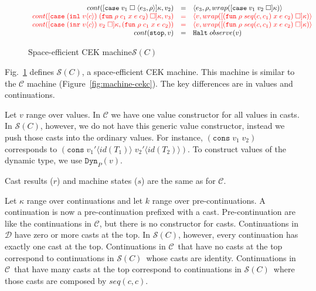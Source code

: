 \documentclass[acmsmall,review,anonymous]{acmart}\settopmatter{printfolios=true,printccs=false,printacmref=false}
\newcommand{\figref}[1]{Fig.~\ref{#1}}
\newcommand{\funrule}[3]{#1 &=& #2 & #3\\}
\newcommand{\hifunrule}[3]{\highlight{#1} &\highlight{=}& \highlight{#2} & 
\highlight{#3}\\}
\newcommand{\sOOinspect}[3]{\langle#1,#2,#3\rangle}
\newcommand{\sOOreturn}[2]{\langle#1,#2\rangle}
\newcommand{\sOOhalt}[1]{\mathtt{Halt} \; #1}
\newcommand{\vOOcons}[2]{\mathtt{cons}\;#1\;#2}
\newcommand{\kOOmt}[0]{\mathtt{stop}}
\newcommand{\kOOappII}[2]{
  [#1 \; \square]#2}
\newcommand{\kOOcaseII}[4]{
  [\mathtt{case} \; #1 \; \square \; \langle#2,#3\rangle ]#4}
\newcommand{\kOOcaseIII}[3]{
  [\mathtt{case} \; #1 \; #2 \; \square]#3}
\newcommand{\hcvOOinj}[2]{\mathtt{Dyn}_{#1}(#2)}
\newcommand{\hcvOOfun}[5]{\mathtt{fun} \; #2 \; #1 \; #3 \; #4 \; #5}
\newcommand{\hcvOOcons}[4]{\mathtt{cons}\;#1\langle#2\rangle\;#3\langle#4\rangle}
\newcommand{\hcvOOinl}[2]{\mathtt{inl}\;#1\langle#2\rangle}
\newcommand{\hcvOOinr}[2]{\mathtt{inr}\;#1\langle#2\rangle}
\newcommand{\hckOOmt}[0]{\mathtt{stop}}
\newcommand{\judgeSreduceTrans}[3]{#2 \longmapsto_{\mathcal{S}(#1)}^{*} #3}
\newcommand{\judgeSeval}[3]{eval_{\mathcal{S}(#1)}(#2) = #3}
\newcommand{\ineffCEK}{$\mathcal{C}$}
\newcommand{\ineffCEKD}{$\mathcal{D}$}
\newcommand{\effCEK}[1]{$\mathcal{S}(#1)$}
\newcommand{\continue}[2]{cont(#2,#1)}
\newcommand{\highlight}[1]{{\color{red} #1}}
\begin{document}
\begin{figure}
\[\begin{array}{rclr}
\funrule{
  \continue{v_2}{
    \kOOcaseII{v_1}{e_3}{\rho}{\kappa}
  }
}{
  \sOOinspect{e_3}{\rho}{
  wrap(\kOOcaseIII{v_1}{v_2}{\kappa})
  }
}{}

\hifunrule{
  \continue{v_3}{
    \kOOcaseIII{(\hcvOOinl{v}{c})}{(\hcvOOfun{c_1}{\rho}{x}{e}{c_2})}{\kappa}
  }
}{
  \sOOreturn{v}{wrap(\kOOappII{(\hcvOOfun{seq(c,c_1)}{\rho}{x}{e}{c_2})}{\kappa})}
}{}

\hifunrule{
  \continue{(\hcvOOfun{c_1}{\rho}{x}{e}{c_2})}
  {
    \kOOcaseIII{(\hcvOOinr{v}{c})}{v_2}{\kappa}
  }
}{
  \sOOreturn{v}{wrap(\kOOappII{(\hcvOOfun{seq(c,c_1)}{\rho}{x}{e}{c_2})}{\kappa})}
}{}

\funrule{
  \continue{v}{\kOOmt}}{
  \sOOhalt{observe(v)}}{}
  
  \end{array}\]
  
  
  
  \caption{Space-efficient CEK machine$\mathcal{S}(C)$}
  \label{fig:machine-cekcc}
\end{figure}

\figref{fig:machine-cekcc} defines \effCEK{C}, a space-efficient CEK
machine.  This machine is similar to the \ineffCEK{} machine
(Figure~\ref{fig:machine-cekc}).  The key differences are in values
and continuations.

Let $v$ range over values. In \ineffCEK{} we have one value
constructor for all values in casts.  In \effCEK{C}, however, we do not
have this generic value constructor, instead we push those casts into
the ordinary values. For instance, $(\vOOcons{v_1}{v_2})$ corresponds
to $(\hcvOOcons{v_1'}{id(T_1)}{v_2'}{id(T_2)})$. To construct values
of the dynamic type, we use $\hcvOOinj{P}{v}$.

Cast results ($r$) and machine states ($s$) are the same as for
\ineffCEK{}.

Let $\kappa$ range over continuations and let $k$ range over
pre-continuations.  A continuation is now a pre-continuation prefixed
with a cast.  Pre-continuation are like the continuations in
\ineffCEK{}, but there is no constructor for casts.  Continuations in
\ineffCEKD{} have zero or more casts at the top.  In \effCEK{C},
however, every continuation has exactly one cast at the top.
Continuations in \ineffCEK\ that have no casts at the top correspond
to continuations in \effCEK{C}\ whose casts are identity.
Continuations in \ineffCEK\ that have many casts at the top correspond
to continuations in \effCEK{C}\ where those casts are composed by
$seq(c,c)$.
\end{document}
